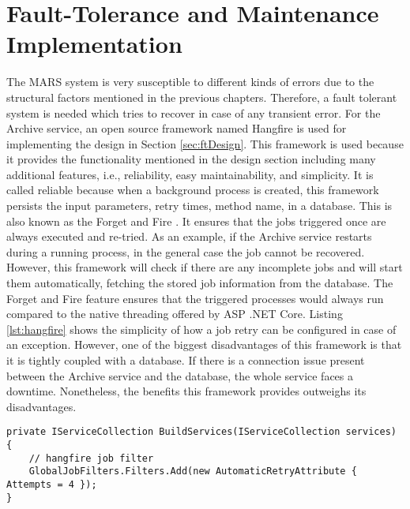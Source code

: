 \newpage
\section{Fault-Tolerance and Maintenance Implementation}
The MARS system is very susceptible to different kinds of errors due to the structural factors mentioned in the previous chapters. Therefore, a fault tolerant
system is needed which tries to recover in case of any transient error. For the Archive service, an open source framework
named Hangfire is used for implementing the design in Section \ref{sec:ftDesign}. This framework is used because it provides
the functionality mentioned in the design section including many additional features, i.e., reliability, easy maintainability, and simplicity. It is called
reliable because when a background process is created, this framework persists the input parameters, retry times, method name, in a database. 
This is also known as the Forget and Fire \cite{Hangfire}. It ensures that the jobs triggered once are always executed and re-tried.
As an example, if the
Archive service restarts during a running process, in the general case the job cannot be recovered. However, this framework will check if 
there are any incomplete jobs and will start them automatically, fetching the stored job information from the database. The Forget and Fire 
feature ensures that the triggered processes would always run compared to the native threading offered by ASP .NET Core.
Listing \ref{lst:hangfire}
shows the simplicity of how a job retry can be configured in case of an exception. However, one of the biggest disadvantages of this framework is that it is 
tightly coupled
with a database. If there is a connection issue present between the Archive service and the database, the whole service faces a downtime. Nonetheless, the 
benefits this framework provides outweighs its disadvantages.

\begin{lstlisting}[language={[Sharp]C}, caption={Hangfire retry attempt configuration}, captionpos=b,label={lst:hangfire}]
private IServiceCollection BuildServices(IServiceCollection services)
{
    // hangfire job filter
    GlobalJobFilters.Filters.Add(new AutomaticRetryAttribute { Attempts = 4 });
}
\end{lstlisting}

